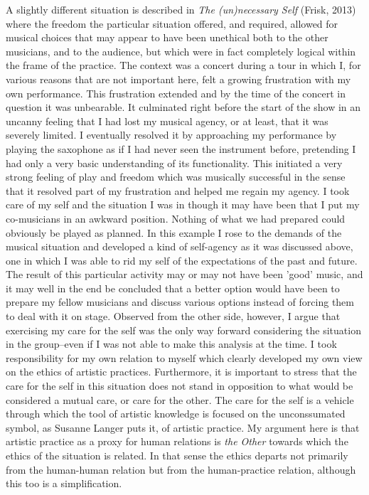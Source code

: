 \documentclass[11pt]{article}
\makeatletter
\newcommand{\cslcitation}[2]
 {\protect\hyper@linkstart{cite}{citeproc_bib_item_#1}#2\hyper@linkend}
\makeatother
\begin{document}
A slightly different situation is described in \emph{The (un)necessary Self} (\cslcitation{9}{Frisk, 2013}) where the freedom the particular situation offered, and required, allowed for musical choices that may appear to have been unethical both to the other musicians, and to the audience, but which were in fact completely logical within the frame of the practice. The context was a concert during a tour in which I, for various reasons that are not important here, felt a growing frustration with my own performance. This frustration extended and by the time of the concert in question it was unbearable. It culminated right before the start of the show in an uncanny feeling that I had lost my musical agency, or at least, that it was severely limited. I eventually resolved it by approaching my performance by playing the saxophone as if I had never seen the instrument before, pretending I had only a very basic understanding of its functionality. This initiated a very strong feeling of play and freedom which was musically successful in the sense that it resolved part of my frustration and helped me regain my agency. I took care of my self and the situation I was in though it may have been that I put my co-musicians in an awkward position. Nothing of what we had prepared could obviously be played as planned. In this example I rose to the demands of the musical situation and developed a kind of self-agency as it was discussed above, one in which I was able to rid my self of the expectations of the past and future. The result of this particular activity may or may not have been 'good' music, and it may well in the end be concluded that a better option would have been to prepare my fellow musicians and discuss various options instead of forcing them to deal with it on stage. Observed from the other side, however, I argue that exercising my care for the self was the only way forward considering the situation in the group--even if I was not able to make this analysis at the time. I took responsibility for my own relation to myself which clearly developed my own view on the ethics of artistic practices. Furthermore, it is important to stress that the care for the self in this situation does not stand in opposition to what would be considered a mutual care, or care for the other. The care for the self is a vehicle through which the tool of artistic knowledge is focused on the unconssumated symbol, as Susanne Langer puts it, of artistic practice.
My argument here is that artistic practice as a proxy for human relations is \emph{the Other} towards which the ethics of the situation is related.
In that sense the ethics departs not primarily from the human-human relation but from the human-practice relation, although this too is a simplification. 
\end{document}
